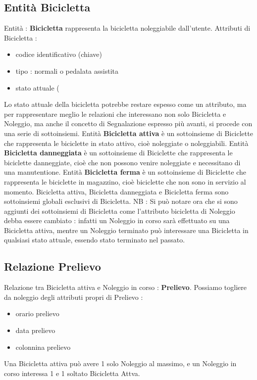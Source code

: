 \documentclass[a4paper,twoside]{article}
\begin{document}
\subsection{Entità Bicicletta}
Entità : \textbf{Bicicletta} rappresenta la bicicletta noleggiabile dall'utente.\newline
Attributi di Bicicletta :
\begin{itemize}
 \item codice identificativo (chiave)
 \item tipo : normali o pedalata assistita
 \item stato attuale (
\end{itemize}
Lo stato attuale della bicicletta potrebbe restare espesso come un attributo, ma per rappresentare meglio le relazioni che interessano non solo Bicicletta e Noleggio, ma anche il concetto di Segnalazione espresso più avanti, si procede con una serie di sottoinsiemi.\newline
Entità \textbf{Bicicletta attiva} è un sottoinsieme di Biciclette che rappresenta le biciclette in stato attivo, cioè noleggiate o noleggiabili.\newline
Entità \textbf{Bicicletta danneggiata} è un sottoinsieme di Biciclette che rappresenta le biciclette danneggiate, cioè che non possono venire noleggiate e necessitano di una manutentione.\newline
Entità \textbf{Bicicletta ferma} è un sottoinsieme di Biciclette che rappresenta le biciclette in magazzino, cioè biciclette che non sono in servizio al momento.\newline
Bicicletta attiva, Bicicletta danneggiata e Bicicletta ferma sono sottoinsiemi globali esclusivi di Bicicletta.\newline
NB :\newline
Si può notare ora che si sono aggiunti dei sottoinsiemi di Bicicletta come l'attributo bicicletta di Noleggio debba essere cambiato : infatti un Noleggio in corso sarà effettuato su una Bicicletta attiva, mentre un Noleggio terminato può interessare una Bicicletta in qualsiasi stato attuale, essendo stato terminato nel passato.

\subsection{Relazione Prelievo}
Relazione tra Bicicletta attiva e Noleggio in corso : \textbf{Prelievo}.\newline
Possiamo togliere da noleggio degli attributi propri di Prelievo :
\begin{itemize}
 \item orario prelievo
 \item data prelievo
 \item colonnina prelievo
\end{itemize}
Una Bicicletta attiva può avere 1 solo Noleggio al massimo, e un Noleggio in corso interessa 1 e 1 soltato Bicicletta Attva.
\end{document}
